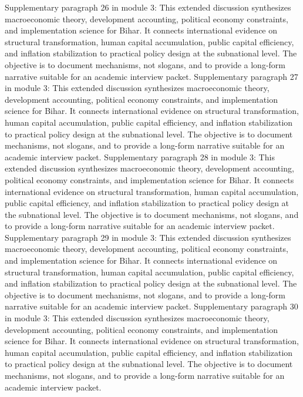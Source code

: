 \documentclass[preprint,12pt]{elsarticle}
\begin{document}
Supplementary paragraph 26 in module 3: This extended discussion synthesizes macroeconomic theory, development accounting, political economy constraints, and implementation science for Bihar. It connects international evidence on structural transformation, human capital accumulation, public capital efficiency, and inflation stabilization to practical policy design at the subnational level. The objective is to document mechanisms, not slogans, and to provide a long-form narrative suitable for an academic interview packet.
Supplementary paragraph 27 in module 3: This extended discussion synthesizes macroeconomic theory, development accounting, political economy constraints, and implementation science for Bihar. It connects international evidence on structural transformation, human capital accumulation, public capital efficiency, and inflation stabilization to practical policy design at the subnational level. The objective is to document mechanisms, not slogans, and to provide a long-form narrative suitable for an academic interview packet.
Supplementary paragraph 28 in module 3: This extended discussion synthesizes macroeconomic theory, development accounting, political economy constraints, and implementation science for Bihar. It connects international evidence on structural transformation, human capital accumulation, public capital efficiency, and inflation stabilization to practical policy design at the subnational level. The objective is to document mechanisms, not slogans, and to provide a long-form narrative suitable for an academic interview packet.
Supplementary paragraph 29 in module 3: This extended discussion synthesizes macroeconomic theory, development accounting, political economy constraints, and implementation science for Bihar. It connects international evidence on structural transformation, human capital accumulation, public capital efficiency, and inflation stabilization to practical policy design at the subnational level. The objective is to document mechanisms, not slogans, and to provide a long-form narrative suitable for an academic interview packet.
Supplementary paragraph 30 in module 3: This extended discussion synthesizes macroeconomic theory, development accounting, political economy constraints, and implementation science for Bihar. It connects international evidence on structural transformation, human capital accumulation, public capital efficiency, and inflation stabilization to practical policy design at the subnational level. The objective is to document mechanisms, not slogans, and to provide a long-form narrative suitable for an academic interview packet.
\end{document}
